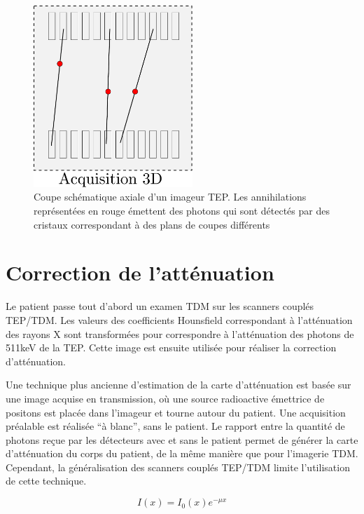 \begin{figure}
\centering
\includegraphics[width=6cm]{images/2D3D}
\caption[Acquisitions 3D en TEP]{Coupe schématique axiale d'un imageur TEP. Les annihilations représentées en rouge émettent des photons qui sont détectés par des cristaux correspondant à des plans de coupes différents}
\label{fig:2D3D}
\end{figure}



	\section{Correction de l'atténuation}
\label{CorrectionAttenuation}

Le patient passe tout d'abord un examen TDM sur les scanners couplés TEP/TDM. Les valeurs des coefficients Hounsfield correspondant à l'atténuation des rayons X sont transformées pour correspondre à l'atténuation des photons de 511keV de la TEP. Cette image est ensuite utilisée pour réaliser la correction d'atténuation. 

Une technique plus ancienne d'estimation de la carte d'atténuation est basée sur une image acquise en transmission, où une source radioactive émettrice de positons est placée dans l'imageur et tourne autour du patient. Une acquisition  préalable est réalisée ``à blanc'', sans le patient. Le rapport entre la quantité de photons reçue par les détecteurs avec et sans le patient permet de générer la carte d'atténuation du corps du patient, de la même manière que pour l'imagerie TDM. Cependant, la généralisation des scanners couplés TEP/TDM limite l'utilisation de cette technique.

\begin{equation}
I(x) = I_0(x) e^{-\mu x}
\end{equation}

